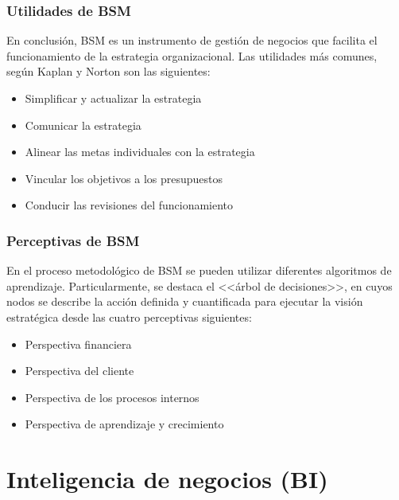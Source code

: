 \documentclass[11pt,titlepage]{report}
\begin{document}
\subsubsection{Utilidades de BSM}
En conclusión, BSM es un instrumento de gestión de negocios que facilita el funcionamiento de la estrategia organizacional. Las utilidades más comunes, según Kaplan y Norton son las siguientes:
\begin{itemize}
\item Simplificar y actualizar la estrategia
\item Comunicar la estrategia
\item Alinear las metas individuales con la estrategia
\item Vincular los objetivos a los presupuestos
\item Conducir las revisiones del funcionamiento
\end{itemize}

\subsubsection{Perceptivas de BSM}
En el proceso metodológico de BSM se pueden utilizar diferentes algoritmos de aprendizaje. Particularmente, se destaca el <<árbol de decisiones>>, en cuyos nodos se describe la acción definida y cuantificada para ejecutar la visión estratégica desde las cuatro perceptivas siguientes:
 \begin{itemize}
\item Perspectiva financiera
\item Perspectiva del cliente
\item Perspectiva de los procesos internos
\item Perspectiva de aprendizaje y crecimiento
\end{itemize}

\newpage
\section{Inteligencia de negocios (BI)}
\end{document}
